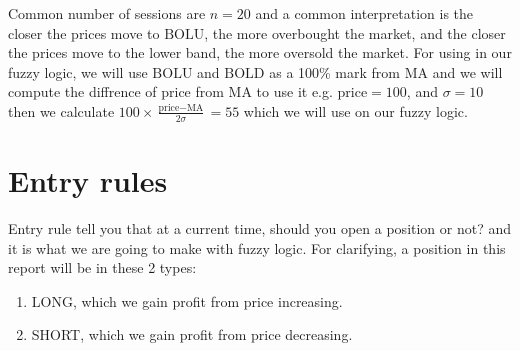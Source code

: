 \documentclass{article}
\begin{document}
Common number of sessions are $n = 20$ and a common interpretation is the closer the prices move to $\text{BOLU}$, 
the more overbought the market, and the closer the prices move to the lower band, the more oversold the market.
For using in our fuzzy logic, we will use $\text{BOLU}$ and $\text{BOLD}$ as a 100\% mark from $\text{MA}$ and we will
compute the diffrence of price from $\text{MA}$ to use it e.g. $\text{price} = 100$, and $\sigma = 10$
then we calculate $100 \times \frac{\text{price} - \text{MA}}{2\sigma} = 55$ which we will use on our fuzzy logic.  

\section*{Entry rules}
Entry rule tell you that at a current time, should you open a position or not? and it is what we are going to make with fuzzy logic.
For clarifying, a position in this report will be in these 2 types:
\begin{enumerate}
    \item LONG, which we gain profit from price increasing.
    \item SHORT, which we gain profit from price decreasing.
\end{enumerate}
\end{document}
